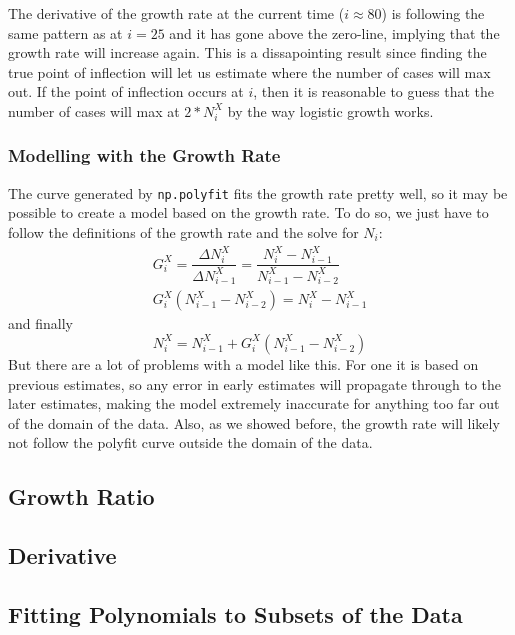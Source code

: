 \documentclass{report}
\begin{document}
            The derivative of the growth rate at the current time ($i \approx 80$) is following the same pattern as at $i = 25$ and it has gone above the zero-line, implying that the growth rate will increase again.
            \newline
            \indent This is a dissapointing result since finding the true point of inflection will let us estimate where the number of cases will max out. If the point of inflection occurs at $i$, then it is reasonable to guess that the number of cases will max at $2 * N^X_i$ by the way logistic growth works.
            \subsubsection{Modelling with the Growth Rate}
                The curve generated by \lstinline{np.polyfit} fits the growth rate pretty well, so it may be possible to create a model based on the growth rate. To do so, we just have to follow the definitions of the growth rate and the solve for $N_i$:
                \begin{align*}
                    G^X_i = \dfrac{\Delta N^X_i}{\Delta N^X_{i - 1}} = \dfrac{N^X_i - N^X_{i - 1}}{N^X_{i - 1} - N^X_{i - 2}} \\
                    G^X_i(N^X_{i - 1} - N^X_{i - 2}) = N^X_i - N^X_{i - 1}
                \end{align*}
                and finally
                \begin{equation}
                    N^X_i = N^X_{i - 1} + G^X_i(N^X_{i - 1} - N^X_{i - 2})
                \end{equation}
                But there are a lot of problems with a model like this. For one it is based on previous estimates, so any error in early estimates will propagate through to the later estimates, making the model extremely inaccurate for anything too far out of the domain of the data.
                \newline
                \indent Also, as we showed before, the growth rate will likely not follow the polyfit curve outside the domain of the data.
        \subsection{Growth Ratio}
        \subsection{Derivative}
        \subsection{Fitting Polynomials to Subsets of the Data}
\end{document}
